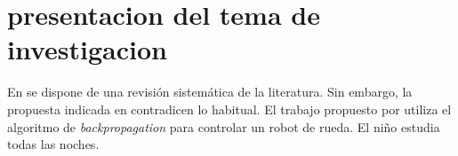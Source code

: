 \section{presentacion del tema de investigacion}
En \cite{nogueira2017image} se       dispone de una revisión sistemática de la literatura. Sin embargo, la propuesta indicada en \cite{dawkins_biology_2016} contradicen lo habitual. El trabajo propuesto por \cite{priandana2018backprop} utiliza el algoritmo de \textit{backpropagation} para controlar un robot de rueda. El niño estudia todas las noches.

\lipsum[2-4] 
